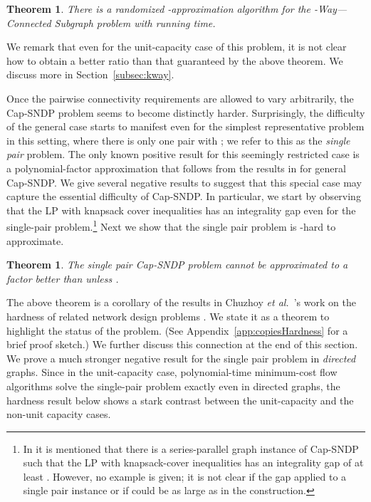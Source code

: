 \documentclass[11pt]{article}
\newcounter{thm0Rcopies}
\newcounter{thm_saved}
\newtheorem{theorem}[lemma]{Theorem}
\newcommand{\etal}{{\em et al.}\ }
\def\kway{-Way---Connected Subgraph\xspace}
\begin{document}
\begin{theorem}\label{thm:kWay}
  There is a randomized -approximation algorithm for the
  \kway problem with  running time.
\end{theorem}

We remark that even for the unit-capacity case of this problem, it is
not clear how to obtain a better ratio than that guaranteed by the
above theorem. We discuss more in Section~\ref{subsec:kway}.

Once the pairwise connectivity requirements are allowed to vary
arbitrarily, the Cap-SNDP problem seems to become distinctly harder.
Surprisingly, the difficulty of the general case starts to manifest
even for the simplest representative problem in this setting, where
there is only one pair  with ; we refer to this as
the {\em single pair} problem.  The only known positive result for
this seemingly restricted case is a polynomial-factor approximation
that follows from the results in \cite{GG+,CFLP} for general Cap-SNDP.
We give several negative results to suggest that this special case may
capture the essential difficulty of Cap-SNDP.  In particular, we start
by observing that the LP with knapsack cover inequalities has an
 integrality gap even for the single-pair
problem.\footnote{In \cite{CFLP} it is mentioned that there is a
  series-parallel graph instance of Cap-SNDP such that the LP with
  knapsack-cover inequalities has an integrality gap of at least
  . However, no example is given; it is not
  clear if the gap applied to a single pair instance or if 
  could be as large as  in the construction.} Next we show that
the single pair problem is -hard to approximate.
  

\begin{theorem}\label{thm:singlePairHardness}
  The single pair Cap-SNDP problem cannot be approximated to a factor
  better than  unless .
\end{theorem}

The above theorem is a corollary of the results in Chuzhoy \etal's
work on the hardness of related network design problems
\cite{CGNS}. We state it as a theorem to highlight the status of the
problem. (See Appendix~\ref{app:copiesHardness} for a brief proof
sketch.)  We further discuss this connection at the end of this
section. We prove a much stronger negative result for the single pair
problem in {\em directed} graphs. Since in the unit-capacity case,
polynomial-time minimum-cost flow algorithms solve the single-pair
problem exactly even in directed graphs, the hardness result below
shows a stark contrast between the unit-capacity and the non-unit
capacity cases.
\end{document}
